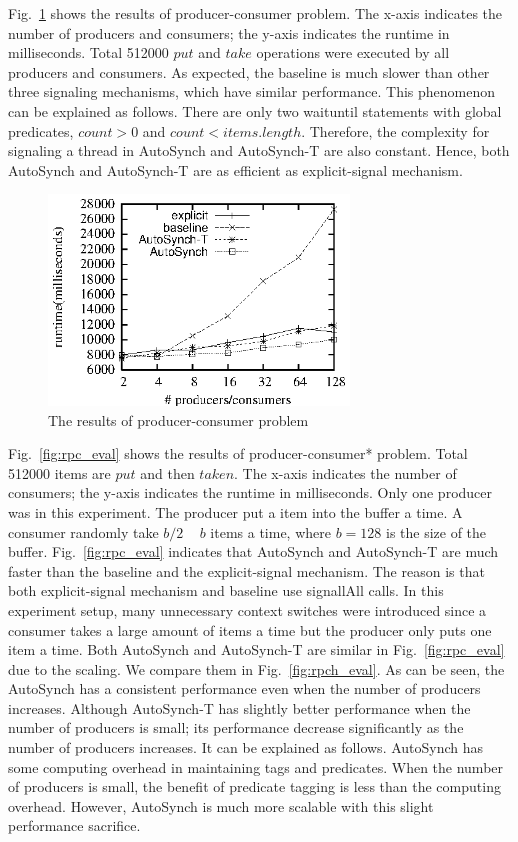 \documentclass[preprint]{sigplanconf}
\begin{document}
Fig.~\ref{fig:pc_eval} shows the results of producer-consumer problem. The 
x-axis indicates the number of producers and consumers; the y-axis indicates 
the runtime in milliseconds. Total 
512000 $put$ and $take$ operations were executed by
all producers and consumers. As expected, the baseline is much slower than
other three signaling mechanisms, which have similar performance. This 
phenomenon can be explained as follows. There are only two waituntil statements 
with global predicates, $count > 0$ and $count < items.length$. Therefore, the 
complexity for signaling a thread in AutoSynch and AutoSynch-T are also constant. 
Hence, both AutoSynch and AutoSynch-T are as efficient as explicit-signal 
mechanism. 

\begin{figure}[ht!]
  \centering
  \includegraphics[width=80mm]{fig/pc.eps}
  \caption{The results of producer-consumer problem}
  \label{fig:pc_eval}
\end{figure}

Fig.~\ref{fig:rpc_eval} shows the results of producer-consumer* problem. Total
512000 items are $put$ and then $taken$. The x-axis indicates the number of 
consumers; the y-axis indicates the runtime in milliseconds. Only one producer
was in this experiment. The producer put a item into the buffer a time. A 
consumer randomly take $b/2$ ~ $b$ items a time, where $b = 128$ is the size of 
the buffer. Fig.~\ref{fig:rpc_eval} indicates that AutoSynch and AutoSynch-T are
much faster than the baseline and the explicit-signal mechanism. The reason is
that both explicit-signal mechanism and baseline use signallAll calls. In this
experiment setup, many unnecessary context switches were introduced since a
consumer takes a large amount of items a time but the producer only puts one
item a time. Both AutoSynch and AutoSynch-T are similar in
Fig.~\ref{fig:rpc_eval} due to the scaling. We compare them in
Fig.~\ref{fig:rpch_eval}. As can be seen, the AutoSynch has a consistent
performance even when the number of producers increases. Although AutoSynch-T has
slightly better performance when the number of producers is small; its 
performance decrease significantly as the number of producers increases. It can
be explained as follows. AutoSynch has some computing overhead in maintaining 
tags and predicates. When the number of producers is small, the benefit of
predicate tagging is less than the computing overhead. However, AutoSynch is
much more scalable with this slight performance sacrifice.
\end{document}
